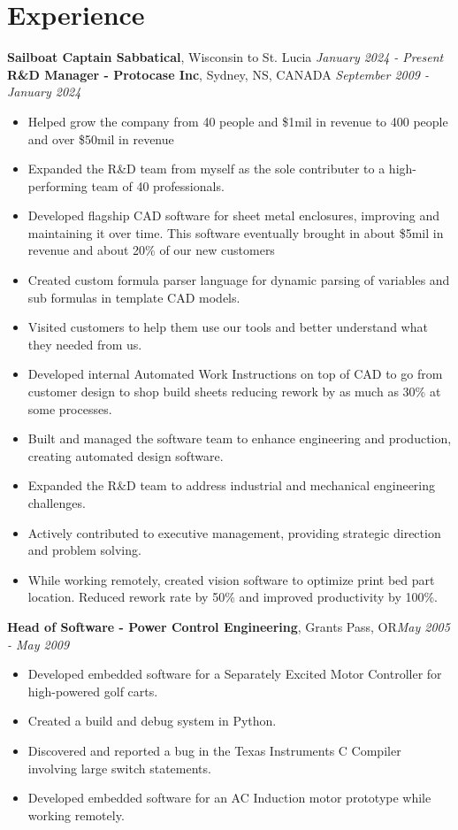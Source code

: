 \documentclass[letter,11pt]{article}
\begin{document}
\section*{Experience}
\noindent
\textbf{Sailboat Captain Sabbatical}, Wisconsin to St. Lucia \hfill \textit{January 2024 - Present}\\

\noindent
\textbf{R\&D Manager - Protocase Inc}, Sydney, NS, CANADA \hfill \textit{September 2009 - January 2024}
\begin{itemize}[leftmargin=*,itemsep=0pt, parsep=0pt,label=$\diamond$]
\item Helped grow the company from 40 people and \$1mil in revenue to 400 people and over \$50mil in revenue
\item Expanded the R\&D team from myself as the sole contributer to a high-performing team of 40 professionals.
\item Developed flagship CAD software for sheet metal enclosures, improving and maintaining it over time. This software eventually brought in about \$5mil in revenue and about 20\% of our new customers
\item Created custom formula parser language for dynamic parsing of variables and sub formulas in template CAD models.
\item Visited customers to help them use our tools and better understand what they needed from us.
\item Developed internal Automated Work Instructions on top of CAD to go from customer design to shop build sheets reducing rework by as much as 30\% at some processes.
\item Built and managed the software team to enhance engineering and production, creating automated design software.
\item Expanded the R\&D team to address industrial and mechanical engineering challenges.
\item Actively contributed to executive management, providing strategic direction and problem solving.
\item While working remotely, created vision software to optimize print bed part location. Reduced rework rate by 50\% and improved productivity by 100\%.
\end{itemize}

\noindent
\textbf{Head of Software - Power Control Engineering}, Grants Pass, OR\hfill \textit{May 2005 - May 2009}
\begin{itemize}[leftmargin=*,itemsep=0pt, parsep=0pt,label=$\diamond$]
\item Developed embedded software for a Separately Excited Motor Controller for high-powered golf carts.
\item Created a build and debug system in Python.
\item Discovered and reported a bug in the Texas Instruments C Compiler involving large switch statements.
\item Developed embedded software for an AC Induction motor prototype while working remotely.
\end{itemize}
\end{document}
